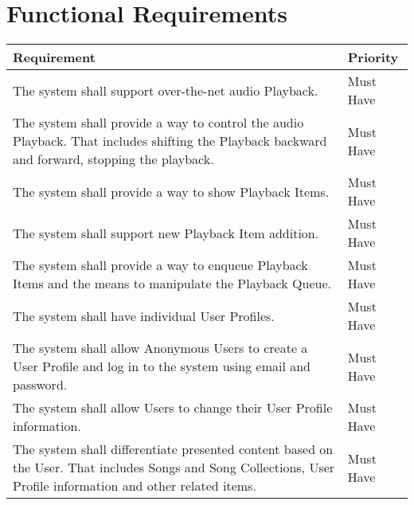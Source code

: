 \section{Functional Requirements}

\begin{table}[h!]
    \centering
    \begin{tabular}{|p{12cm}|p{3cm}|}
        \hline
        \textbf{Requirement}                                                                                                                                                  & \textbf{Priority} \\
        \hline
        The system shall support over-the-net audio Playback.                                                                                                                 & Must Have         \\
        \hline
        The system shall provide a way to control the audio Playback. That includes shifting the Playback backward and forward, stopping the playback. & Must Have \\
        \hline
        The system shall provide a way to show Playback Items.                                                                                                                & Must Have         \\
        \hline
        The system shall support new Playback Item addition.                                                                                                                  & Must Have         \\
        \hline
        The system shall provide a way to enqueue Playback Items and the means to manipulate the Playback Queue. & Must Have \\
        \hline
        The system shall have individual User Profiles.                                                                                                                       & Must Have         \\
        \hline
        The system shall allow Anonymous Users to create a User Profile and log in to the system using email and password. & Must Have \\
        \hline
        The system shall allow Users to change their User Profile information.                                                                                                & Must Have         \\
        \hline
        The system shall differentiate presented content based on the User. That includes Songs and Song Collections, User Profile information and other related items. & Must Have \\

\end{tabular}
\end{table}
